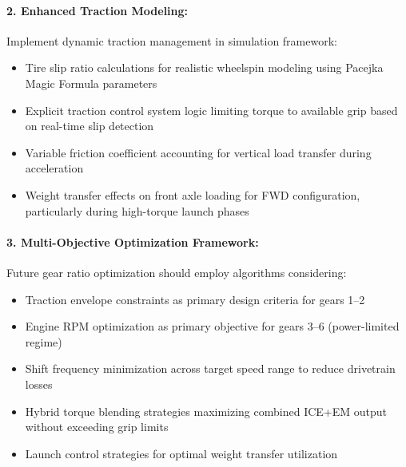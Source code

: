 \paragraph{2. Enhanced Traction Modeling:}
Implement dynamic traction management in simulation framework:
\begin{itemize}
    \item Tire slip ratio calculations for realistic wheelspin modeling using Pacejka Magic Formula parameters
    \item Explicit traction control system logic limiting torque to available grip based on real-time slip detection
    \item Variable friction coefficient accounting for vertical load transfer during acceleration
    \item Weight transfer effects on front axle loading for FWD configuration, particularly during high-torque launch phases
\end{itemize}

\paragraph{3. Multi-Objective Optimization Framework:}
Future gear ratio optimization should employ algorithms considering:
\begin{itemize}
    \item Traction envelope constraints as primary design criteria for gears 1--2
    \item Engine RPM optimization as primary objective for gears 3--6 (power-limited regime)
    \item Shift frequency minimization across target speed range to reduce drivetrain losses
    \item Hybrid torque blending strategies maximizing combined ICE+EM output without exceeding grip limits
    \item Launch control strategies for optimal weight transfer utilization
\end{itemize}
